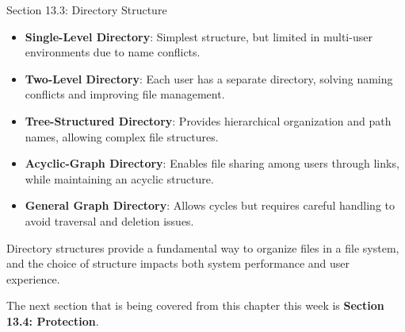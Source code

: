 \begin{notes}{Section 13.3: Directory Structure}
\begin{highlight}
    \end{highlight}
    
    \begin{highlight}
    
        \begin{itemize}
            \item \textbf{Single-Level Directory}: Simplest structure, but limited in multi-user environments due to name conflicts.
            \item \textbf{Two-Level Directory}: Each user has a separate directory, solving naming conflicts and improving file management.
            \item \textbf{Tree-Structured Directory}: Provides hierarchical organization and path names, allowing complex file structures.
            \item \textbf{Acyclic-Graph Directory}: Enables file sharing among users through links, while maintaining an acyclic structure.
            \item \textbf{General Graph Directory}: Allows cycles but requires careful handling to avoid traversal and deletion issues.
        \end{itemize}
    
    Directory structures provide a fundamental way to organize files in a file system, and the choice of structure impacts both system performance and user experience.
    
    \end{highlight}
\end{notes}

The next section that is being covered from this chapter this week is \textbf{Section 13.4: Protection}.

